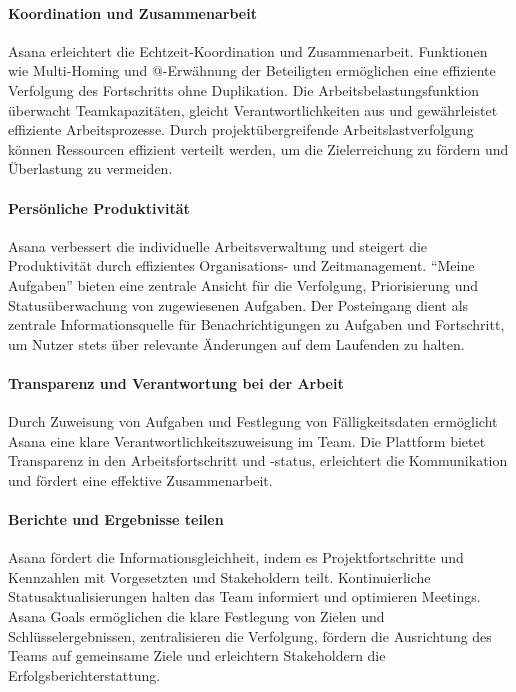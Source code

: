 \documentclass[sigconf, nonacm]{acmart}
\begin{document}
\paragraph{Koordination und Zusammenarbeit}
Asana erleichtert die Echtzeit-Koordination und Zusammenarbeit. Funktionen wie Multi-Homing und @-Erwähnung der Beteiligten ermöglichen eine effiziente Verfolgung des Fortschritts ohne Duplikation. Die Arbeitsbelastungsfunktion überwacht Teamkapazitäten, gleicht Verantwortlichkeiten aus und gewährleistet effiziente Arbeitsprozesse. Durch projektübergreifende Arbeitslastverfolgung können Ressourcen effizient verteilt werden, um die Zielerreichung zu fördern und Überlastung zu vermeiden.

\paragraph{Persönliche Produktivität}
Asana verbessert die individuelle Arbeitsverwaltung und steigert die Produktivität durch effizientes Organisations- und Zeitmanagement. \enquote{Meine Aufgaben} bieten eine zentrale Ansicht für die Verfolgung, Priorisierung und Statusüberwachung von zugewiesenen Aufgaben. Der Posteingang dient als zentrale Informationsquelle für Benachrichtigungen zu Aufgaben und Fortschritt, um Nutzer stets über relevante Änderungen auf dem Laufenden zu halten.

\paragraph{Transparenz und Verantwortung bei der Arbeit}
Durch Zuweisung von Aufgaben und Festlegung von Fälligkeitsdaten ermöglicht Asana eine klare Verantwortlichkeitszuweisung im Team. Die Plattform bietet Transparenz in den Arbeitsfortschritt und -status, erleichtert die Kommunikation und fördert eine effektive Zusammenarbeit.

\paragraph{Berichte und Ergebnisse teilen}
Asana fördert die Informationsgleichheit, indem es Projektfortschritte und Kennzahlen mit Vorgesetzten und Stakeholdern teilt. Kontinuierliche Statusaktualisierungen halten das Team informiert und optimieren Meetings. Asana Goals ermöglichen die klare Festlegung von Zielen und Schlüsselergebnissen, zentralisieren die Verfolgung, fördern die Ausrichtung des Teams auf gemeinsame Ziele und erleichtern Stakeholdern die Erfolgsberichterstattung.
\end{document}
